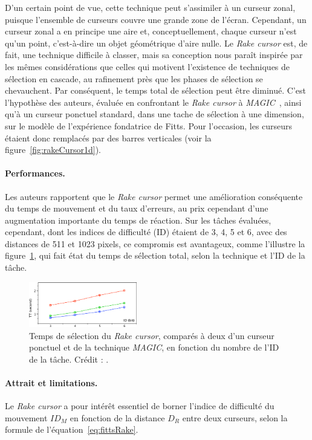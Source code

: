 	D'un certain point de vue, cette technique peut s'assimiler à un curseur zonal, puisque l'ensemble de curseurs couvre une grande zone de l'écran. Cependant, un curseur zonal a en principe une aire et, conceptuellement, chaque curseur n'est qu'un point, c'est-à-dire un objet géométrique d'aire nulle. Le \emph{Rake cursor} est, de fait, une technique difficile à classer, mais sa conception nous paraît inspirée par les mêmes considérations que celles qui motivent l'existence de techniques de sélection en cascade, au rafinement près que les phases de sélection se chevauchent. Par conséquent, le temps total de sélection peut être diminué. C'est l'hypothèse des auteurs, évaluée en confrontant le \emph{Rake cursor} à \emph{MAGIC}~\cite{zhai1999manual}, ainsi qu'à un curseur ponctuel standard, dans une tache de sélection à une dimension, sur le modèle de l'expérience fondatrice de Fitts. Pour l'occasion, les curseurs étaient donc remplacés par des barres verticales (voir la figure~\ref{fig:rakeCursor1d}).
	
	\paragraph{Performances.}
	Les auteurs rapportent que le \emph{Rake cursor} permet une amélioration conséquente du temps de mouvement et du taux d'erreurs, au prix cependant d'une augmentation importante du temps de réaction. Sur les tâches évaluées, cependant, dont les indices de difficulté (ID) étaient de 3, 4, 5 et 6, avec des distances de 511 et 1023 pixels, ce compromis est avantageux, comme l'illustre la figure~\ref{fig:rakeCursorPerf}, qui fait état du temps de sélection total, selon la technique et l'ID de la tâche.
	
	\begin{figure}
		\centering
		\includegraphics[width=0.42\textwidth]{figures/ch2/rakeCursorPerf}
		\caption[\emph{Rake cursor} -- performances]{Temps de sélection du \emph{Rake cursor}, comparés à deux d'un curseur ponctuel et de la technique \emph{MAGIC}, en fonction du nombre de l'ID de la tâche. Crédit : \cite{blanch2009rake}.}
		\label{fig:rakeCursorPerf}
	\end{figure}
	
	\paragraph{Attrait et limitations.}
	Le \emph{Rake cursor} a pour intérêt essentiel de borner l'indice de difficulté du mouvement $ID_{M}$ en fonction de la distance $D_{R}$ entre deux curseurs, selon la formule de l'équation~\ref{eq:fittsRake}.
	
